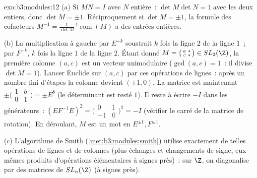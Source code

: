 \begin{solution}{exo:b3:modules:12}
(a) Si $MN = I$ avec $N$ entière~: $\det M\det N = 1$ avec les
deux entiers, donc $\det M = \pm1$. Réciproquement si $\det M =
\pm1$, la formule des cofacteurs $M^{-1} =
\frac1{\det M}\,{}^t\!\operatorname{com}(M)$ a des entrées
entières.

(b) La multiplication à gauche par $E^{-k}$ soustrait $k$ fois
la ligne $2$ de la ligne $1$~; par $F^{-k}$, $k$ fois la ligne
$1$ de la ligne $2$. Étant donné $M =
\bigl(\begin{smallmatrix}a & *\\ c & *\end{smallmatrix}\bigr)
\in SL_2(\Z)$, la première colonne $(a, c)$ est un vecteur
unimodulaire ($\gcd(a, c) = 1$~: il divise $\det M = 1$). Lancer
Euclide sur $(a, c)$ par ces opérations de lignes~: après un
nombre fini d'étapes la colonne devient $(\pm1, 0)$. La matrice
est maintenant $\pm \bigl(\begin{smallmatrix}1 & b\\ 0 &
1\end{smallmatrix}\bigr) = \pm E^{b}$ (le déterminant est resté
$1$). Il reste à écrire $-I$ dans les générateurs~:
$(EF^{-1}E)^2 = \bigl(\begin{smallmatrix}0 & 1\\ -1 &
0\end{smallmatrix}\bigr)^2 = -I$ (vérifier le carré de la matrice
de rotation). En déroulant, $M$ est un mot en $E^{\pm1},
F^{\pm1}$.

(c) L'algorithme de Smith (\cref{met:b3:modules:smith}) utilise
exactement de telles opérations de lignes et de colonnes (plus
échanges et changements de signe, eux-mêmes produits
d'opérations élémentaires à signes près)~: sur $\Z$, on
diagonalise par des matrices de $SL_n(\Z)$ (à signes près).
\end{solution}

